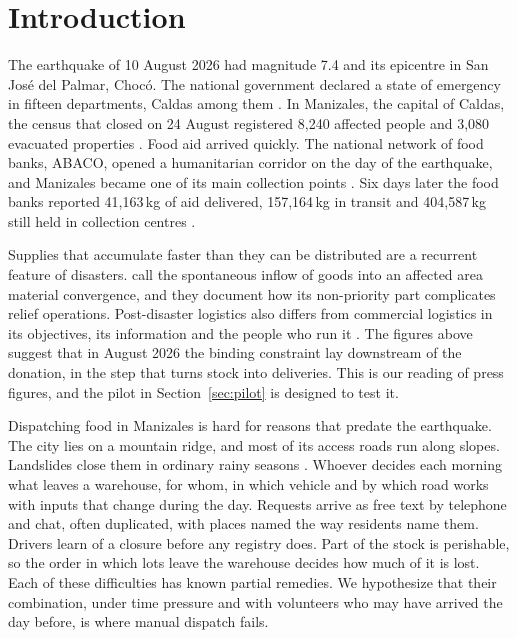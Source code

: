 \documentclass[11pt]{article}
\begin{document}
\section{Introduction}\label{sec:intro}

The earthquake of 10 August 2026 had magnitude 7.4 and its epicentre in San José del Palmar, Chocó. The national government declared a state of emergency in fifteen departments, Caldas among them \citep{decreto2026emergencia}. In Manizales, the capital of Caldas, the census that closed on 24 August registered 8,240 affected people and 3,080 evacuated properties \citep{rcn2026demolicion}. Food aid arrived quickly. The national network of food banks, ABACO, opened a humanitarian corridor on the day of the earthquake, and Manizales became one of its main collection points \citep{rcn2026corredor}. Six days later the food banks reported 41,163\,kg of aid delivered, 157,164\,kg in transit and 404,587\,kg still held in collection centres \citep{portafolio2026flypass}.

Supplies that accumulate faster than they can be distributed are a recurrent feature of disasters. \citet{holguinveras2014material} call the spontaneous inflow of goods into an affected area material convergence, and they document how its non-priority part complicates relief operations. Post-disaster logistics also differs from commercial logistics in its objectives, its information and the people who run it \citep{holguinveras2012unique}. The figures above suggest that in August 2026 the binding constraint lay downstream of the donation, in the step that turns stock into deliveries. This is our reading of press figures, and the pilot in Section~\ref{sec:pilot} is designed to test it.

Dispatching food in Manizales is hard for reasons that predate the earthquake. The city lies on a mountain ridge, and most of its access roads run along slopes. Landslides close them in ordinary rainy seasons \citep{ani2021cierre,invias767}. Whoever decides each morning what leaves a warehouse, for whom, in which vehicle and by which road works with inputs that change during the day. Requests arrive as free text by telephone and chat, often duplicated, with places named the way residents name them. Drivers learn of a closure before any registry does. Part of the stock is perishable, so the order in which lots leave the warehouse decides how much of it is lost. Each of these difficulties has known partial remedies. We hypothesize that their combination, under time pressure and with volunteers who may have arrived the day before, is where manual dispatch fails.
\end{document}
